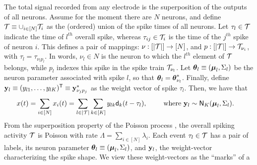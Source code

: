 % 
% 
% 
% 
{The total signal recorded from any electrode  is the superposition of the outputs of all neurons. Assume for the moment there are $N$
neurons, and define $\mathcal{T} \equiv \cup_{i \in [N]} \mathcal{T}_i$ as
the (ordered) union of the spike times of all neurons. 
Let $\tau_l \in \mathcal{T}$ indicate the time of $l^{th}$ overall spike, whereas $\tau_{ij} \in \mathcal{T}_i$ is the time of the $j^{th}$ spike of neuron $i$.
This defines a pair of mappings: $\nu:[|\mathcal{T}|]\rightarrow [N]$, and $p:[|\mathcal{T}|]\rightarrow \mathcal{T}_{\nu_i}$, with %
$\tau_l = \tau_{\nu_l p_l}$. 
In words, $\nu_l \in N$ is the neuron to which the $l^{th}$ element of $\mathcal{T}$ belongs, 
while $p_l$ indexes this spike in the spike train $\mathcal{T}_{\nu_l}$.
Let $\boldsymbol{\theta}_l \equiv (\boldsymbol{\mu}_l, \Sigma_l)$ be the neuron parameter associated with spike $l$, so that $\boldsymbol{\theta}_l = \boldsymbol{\theta}^*_{\nu_l}$. 
Finally, define $\mathbf{y}_l \equiv (y_{l1}, \ldots, y_{lK})^{\mathsf{T}} \equiv \mathbf{y}^*_{\nu_j p_j}$ as the weight vector of spike $\tau_l$. Then, we have that}
\begin{align}
  x(t) &= \sum_{i \in [N]} x_{i}(t) =   \sum_{l \in |\mc{T}|} \sum_{k \in [K]} y_{lk} \mathsf{d}_k(t - \tau_{l}), \qquad %
  \text{ where } \by_{l}  \sim \mathsf{N}_K(\mb{\mu}_{l}, \Sigma_{l}). \label{eq:spk}
\end{align}
% 
From the superposition property of the Poisson process \citep{kingman93}, the overall spiking activity $\mathcal{T}$ is 
Poisson with rate $\Lambda = \sum_{i \in [N]} \lambda_i$. Each event $\tau_l \in \mathcal{T}$ has a pair of labels, its neuron parameter
$\boldsymbol{\theta}_l \equiv (\boldsymbol{\mu}_l, \Sigma_l)$, and $\mathbf{y}_l$, the weight-vector characterizing the spike shape. We view these weight-vectors as the ``marks'' of a 
